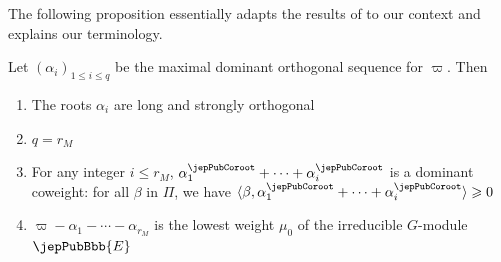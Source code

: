 The following proposition essentially adapts the results of \cite{jep93Kos12} to our context and explains our terminology.
\begin{proposition}
Let $(\alpha_i)_{1\leqslant i\leqslant q}$ be the maximal dominant orthogonal sequence for $\varpi$. Then
\begin{enumerate}[label=(\arabic*)]
\item The roots $\alpha_i$ are long and strongly orthogonal
\item $q=r_M$
\item For any integer $i\leqslant r_M$, $\alpha_1^\jepPubCoroot+\cdots+\alpha_i^\jepPubCoroot$ is a dominant coweight: for all $\beta$ in $\Pi$, we have $\langle\beta,\alpha_1^\jepPubCoroot+\cdots+\alpha_i^\jepPubCoroot\rangle\geqslant0$
\item $\varpi-\alpha_1-\cdots-\alpha_{r_M}$ is the lowest weight $\mu_0$ of the irreducible $G$-module $\jepPubBbb{E}$
\end{enumerate}
\end{proposition}

